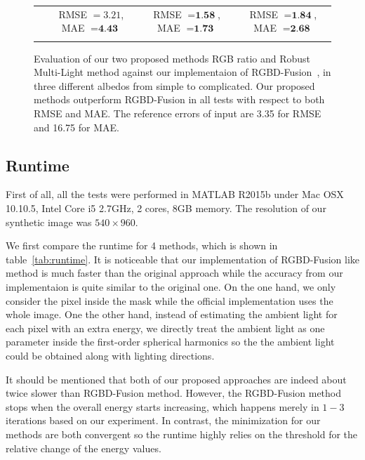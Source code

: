 \begin{figure}
{\begin{tabular}{cccc}
& {\small RMSE $= 3.21$, MAE $=\textbf{4.43}$} & {\small RMSE $= \textbf{1.58}$, MAE $=\textbf{1.73}$} & {\small RMSE $= \textbf{1.84}$, MAE $=\textbf{2.68}$} \\
 \\
  \end{tabular}
  }
  \caption{Evaluation of our two proposed methods RGB ratio and Robust Multi-Light method against our implementaion of RGBD-Fusion~\cite{or2015rgbd}, in three different albedos from simple to complicated. Our proposed methods outperform RGBD-Fusion in all tests with respect to both RMSE and MAE. The reference errors of input are 3.35 for RMSE and 16.75 for MAE.}
  \label{fig:result_syn_comp}
\end{figure}


\subsection{Runtime}
First of all, all the tests were performed in MATLAB R2015b under Mac OSX 10.10.5, Intel Core i5 2.7GHz, 2 cores, 8GB memory. 
The resolution of our synthetic image was $540\times 960$.

We first compare the runtime for 4 methods, which is shown in table~\ref{tab:runtime}.
It is noticeable that our implementation of RGBD-Fusion like method is much faster than the original approach while the accuracy from our implementaion is quite similar to the original one.
On the one hand, we only consider the pixel inside the mask while the official implementation uses the whole image.
One the other hand, instead of estimating the ambient light for each pixel with an extra energy, we directly treat the ambient light as one parameter inside the first-order spherical harmonics so the the ambient light could be obtained along with lighting directions.

It should be mentioned that both of our proposed approaches are indeed about twice slower than RGBD-Fusion method. 
However, the RGBD-Fusion method stops when the overall energy starts increasing, which happens merely in $1-3$ iterations based on our experiment.  
In contrast, the minimization for our methods are both convergent so the runtime highly relies on the threshold for the relative change of the energy values.

